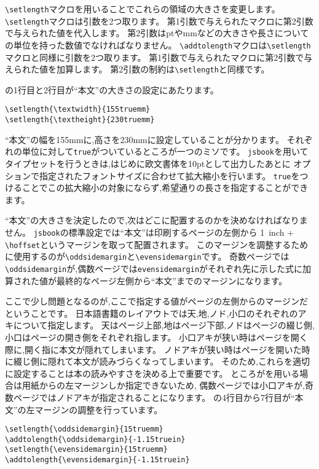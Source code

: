 \verb|\setlength|マクロを用いることでこれらの領域の大きさを変更します。
\verb|\setlength|マクロは引数を2つ取ります。
第1引数で与えられたマクロに第2引数で与えられた値を代入します。
第2引数はptやmmなどの大きさや長さについての単位を持った数値でなければなりません。
\verb|\addtolength|マクロは\verb|\setlength|マクロと同様に引数を2つ取ります。
第1引数で与えられたマクロに第2引数で与えられた値を加算します。
第2引数の制約は\verb|\setlength|と同様です。

の1行目と2行目が``本文''の大きさの設定にあたります。
\begin{verbatim}
\setlength{\textwidth}{155truemm}
\setlength{\textheight}{230truemm}
\end{verbatim}
``本文''の幅を155mmに,高さを230mmに設定していることが分かります。
それぞれの単位に対して\texttt{true}がついているところが一つのミソです。
\texttt{jsbook}を用いてタイプセットを行うときは,はじめに欧文書体を10ptとして出力したあとに
オプションで指定されたフォントサイズに合わせて拡大縮小を行います。
\texttt{true}をつけることでこの拡大縮小の対象にならず,希望通りの長さを指定することができます。

``本文''の大きさを決定したので,次はどこに配置するのかを決めなければなりません。
\texttt{jsbook}の標準設定では``本文''は印刷するページの左側から
1\ inch + \verb|\hoffset|というマージンを取って配置されます。
このマージンを調整するために使用するのが\verb|\oddsidemargin|と\verb|\evensidemargin|です。
奇数ページでは\verb|\oddsidemargin|が,偶数ページでは\verb|evensidemargin|がそれぞれ先に示した式に加算された値が最終的なページ左側から``本文''までのマージンになります。

ここで少し問題となるのが,ここで指定する値がページの左側からのマージンだということです。
日本語書籍のレイアウトでは天,地,ノド,小口のそれぞれのアキについて指定します。
天はページ上部,地はページ下部,ノドはページの綴じ側,小口はページの開き側をそれぞれ指します。
小口アキが狭い時はページを開く際に,開く指に本文が隠れてしまいます。
ノドアキが狭い時はページを開いた時に綴じ側に隠れて本文が読みづらくなってしまいます。
そのため,これらを適切に設定することは本の読みやすさを決める上で重要です。
ところが{\pLaTeX}を用いる場合は用紙からの左マージンしか指定できないため,
偶数ページでは小口アキが,奇数ページではノドアキが指定されることになります。
の4行目から7行目が``本文''の左マージンの調整を行っています。

\begin{verbatim}
\setlength{\oddsidemargin}{15truemm}
\addtolength{\oddsidemargin}{-1.15truein}
\setlength{\evensidemargin}{15truemm}
\addtolength{\evensidemargin}{-1.15truein}
\end{verbatim}

